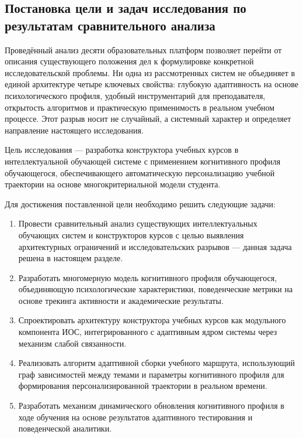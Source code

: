\subsection{Постановка цели и задач исследования по результатам
сравнительного анализа}

Проведённый анализ десяти  образовательных
платформ позволяет перейти от описания существующего положения дел
к формулировке конкретной исследовательской проблемы. Ни одна из
рассмотренных систем не объединяет в единой архитектуре четыре
ключевых свойства: глубокую адаптивность на основе психологического
профиля, удобный инструментарий для преподавателя, открытость
алгоритмов и практическую применимость в реальном учебном процессе.
Этот разрыв носит не случайный, а системный характер и определяет
направление настоящего исследования.

Цель исследования --- разработка конструктора учебных курсов
в интеллектуальной обучающей системе с применением когнитивного
профиля обучающегося, обеспечивающего автоматическую персонализацию
учебной траектории на основе многокритериальной модели студента.

Для достижения поставленной цели необходимо решить следующие задачи:

\begin{enumerate}
  \item Провести сравнительный анализ существующих интеллектуальных
  обучающих систем и конструкторов курсов с целью выявления
  архитектурных ограничений и исследовательских разрывов — данная
  задача решена в настоящем разделе.

  \item Разработать многомерную модель когнитивного профиля
  обучающегося, объединяющую психологические характеристики,
  поведенческие метрики на основе трекинга активности и 
  академические результаты.

  \item Спроектировать архитектуру конструктора учебных курсов
  как модульного компонента ИОС, интегрированного с адаптивным
  ядром системы через механизм слабой связанности.

  \item Реализовать алгоритм адаптивной сборки учебного маршрута,
  использующий граф зависимостей между темами и параметры
  когнитивного профиля для формирования персонализированной
  траектории в реальном времени.

  \item Разработать механизм динамического обновления когнитивного
  профиля в ходе обучения на основе результатов адаптивного
  тестирования и поведенческой аналитики.
\end{enumerate}


